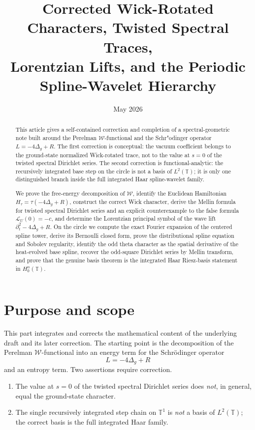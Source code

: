 \documentclass[11pt,a4paper]{article}
\title{Corrected Wick-Rotated Characters, Twisted Spectral Traces,\\
Lorentzian Lifts, and the Periodic Spline-Wavelet Hierarchy}
\author{}
\date{May 2026}
\numberwithin{equation}{section}
\theoremstyle{definition}
\theoremstyle{remark}
\begin{document}
\maketitle

\begin{abstract}
This article gives a self-contained correction and completion of a spectral-geometric note built around the Perelman $\mathcal W$-functional and the Schr"odinger operator $L=-4\Delta_g+R$.  The first correction is conceptual: the vacuum coefficient belongs to the ground-state normalized Wick-rotated trace, not to the value at $s=0$ of the twisted spectral Dirichlet series.  The second correction is functional-analytic: the recursively integrated base step on the circle is not a basis of $L^2(\mathbb T)$; it is only one distinguished branch inside the full integrated Haar spline-wavelet family.

We prove the free-energy decomposition of $\mathcal W$, identify the Euclidean Hamiltonian $H_\tau=\tau(-4\Delta_g+R)$, construct the correct Wick character, derive the Mellin formula for twisted spectral Dirichlet series and an explicit counterexample to the false formula $\mathcal L_U(0)=-c$, and determine the Lorentzian principal symbol of the wave lift $\partial_t^2-4\Delta_g+R$.  On the circle we compute the exact Fourier expansion of the centered spline tower, derive its Bernoulli closed form, prove the distributional spline equation and Sobolev regularity, identify the odd theta character as the spatial derivative of the heat-evolved base spline, recover the odd-square Dirichlet series by Mellin transform, and prove that the genuine basis theorem is the integrated Haar Riesz-basis statement in $H_0^n(\mathbb T)$.
\end{abstract}

\tableofcontents
\section{Purpose and scope}

This part integrates and corrects the mathematical content of the underlying draft and its later correction.  The starting point is the decomposition of the Perelman $\mathcal W$-functional into an energy term for the Schr\"odinger operator
\[
L=-4\Delta_g+R
\]
and an entropy term.  Two assertions require correction.

\begin{enumerate}[label=(\roman*)]
\item The value at $s=0$ of the twisted spectral Dirichlet series does \emph{not}, in general, equal the ground-state character.
\item The single recursively integrated step chain on $\mathbb T^1$ is \emph{not} a basis of $L^2(\mathbb T)$; the correct basis is the full integrated Haar family.
\end{enumerate}
\end{document}
